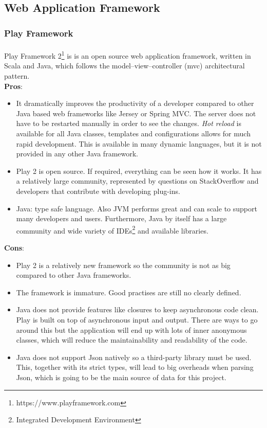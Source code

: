 \documentclass{l4proj}
\begin{document}
\subsection{Web Application Framework}

\subsubsection{Play Framework}
\paragraph{}
Play Framework 2\footnote{https://www.playframework.com} is is an open source web application framework, written in Scala and Java, which follows the model–view–controller (mvc) architectural pattern. 
\\ \textbf{Pros}:
\begin{itemize}

\item It dramatically improves the productivity of a developer compared to other Java based web frameworks like Jersey or Spring MVC. The server does not have to be restarted manually in order to see the changes. \textit{Hot reload} is available for all Java classes, templates and configurations allows for much rapid development. This is available in many dynamic languages, but it is not provided in any other Java framework.

\item Play 2 is open source. If required, everything can be seen how it works. It has a relatively large community, represented by questions on StackOverflow and developers that contribute with developing plug-ins.

\item Java: type safe language. Also JVM performs great and can scale to support many developers and users. Furthermore, Java by itself has a large community and 
wide variety of IDEs\footnote{Integrated Development Environment} and available libraries.
	
\end{itemize}
\textbf{Cons}:
\begin{itemize}
\item Play 2 is a relatively new framework so the community is not as big compared to other Java frameworks. 

\item The framework is immature. Good practises are still no clearly defined. 

\item Java does not provide features like closures to keep asynchronous code clean. Play is built on top of asynchronous input and output. There are ways to go around this but the application will end up with lots of inner anonymous classes, which will reduce the maintainability and readability of the code.

\item Java does not support Json natively so a third-party library must be used. This, together with its strict types, will lead to big overheads when parsing Json, which 
is going to be the main source of data for this project.  
\end{itemize}
\end{document}
